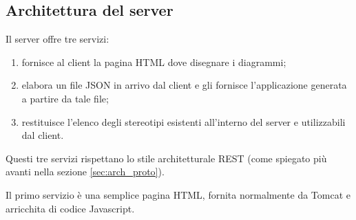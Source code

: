 \subsection{Architettura del server} \label{sec:arch_server}
Il server offre tre servizi:
\begin{enumerate}
	\item fornisce al client la pagina HTML dove disegnare i diagrammi;
	\item elabora un file JSON in arrivo dal client e gli fornisce l'applicazione generata a partire da tale file;
	\item restituisce l'elenco degli stereotipi esistenti all'interno del server e utilizzabili dal client.
\end{enumerate}
Questi tre servizi rispettano lo stile architetturale REST (come spiegato più avanti nella sezione \ref{sec:arch_proto}).

Il primo servizio è una semplice pagina HTML, fornita normalmente da Tomcat e arricchita di codice Javascript.

